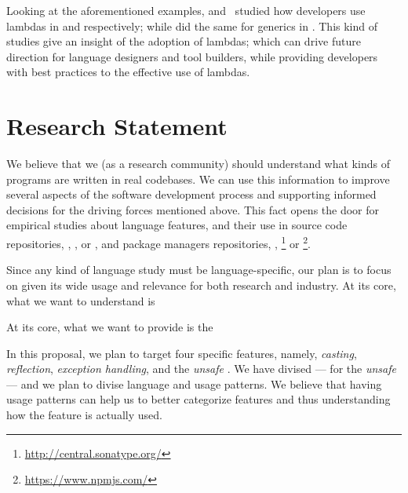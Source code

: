 Looking at the aforementioned examples, \cite{mazinanian_understanding_2017} and~\cite{uesbeck_empirical_2016}
studied how developers use lambdas in \java{} and \cpp{} respectively; while \cite{parnin_java_2011,parnin_adoption_2013} did the same for generics in \java{}.
This kind of studies give an insight of the adoption of lambdas;
which can drive future direction for language designers and tool builders,
while providing developers with best practices to the effective use of lambdas.


\section{Research Statement}

We believe that we (as a research community) should understand what kinds of programs are written in real codebases.
We can use this information to improve several aspects of the software development process and supporting informed decisions for the driving forces mentioned above.
This fact opens the door for empirical studies about language features, and their use in source code repositories, \eg{}, \github{}, \gitlab{} or \bitbucket{}, and package managers repositories, \eg{}, \mavencentral{}\footnote{\url{http://central.sonatype.org/}} or
\npm{}\footnote{\url{https://www.npmjs.com/}}.

Since any kind of language study must be language-specific, our plan is to focus on \java{} given its wide usage and relevance for both research and industry.
At its core, what we want to understand is



At its core, what we want to provide is the


In this proposal, we plan to target four specific \java{} features, namely, \emph{casting}, \emph{reflection}, \emph{exception handling}, and the \emph{unsafe \api{}}.
We have divised --- for the \emph{unsafe} \api{} --- and we plan to divise language and \api{} usage patterns.
We believe that having usage patterns can help us to better categorize features and thus understanding how the feature is actually used.

